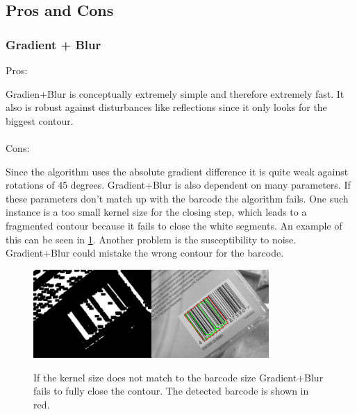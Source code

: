 \subsection{Pros and Cons}\label{sec:ProCon}
\subsubsection*{Gradient + Blur}
Pros:

Gradien+Blur is conceptually extremely simple and therefore extremely fast. It also is robust against disturbances like reflections since it only looks for the biggest contour.
\\
\\
Cons:

Since the algorithm uses the absolute gradient difference it is quite weak against rotations of 45 degrees. Gradient+Blur is also dependent on many parameters. If these parameters don't match up with the barcode the algorithm fails. One such instance is a too small kernel size for the closing step, which leads to a fragmented contour because it fails to close the white segments. An example of this can be seen in \cref{failgradblur}. Another problem is the susceptibility to noise. Gradient+Blur could mistake the wrong contour for the barcode.

\begin{figure}[t]
\center
\includegraphics[width=0.4\textwidth,natwidth=800,natheight=600]{img/gradientblurfail.jpg}\includegraphics[width=0.4\textwidth,natwidth=800,natheight=600]{img/gradientblurfail2.jpg}
\caption{If the kernel size does not match to the barcode size Gradient+Blur fails to fully close the contour. The detected barcode is shown in red.}
\label{failgradblur}
\end{figure}

